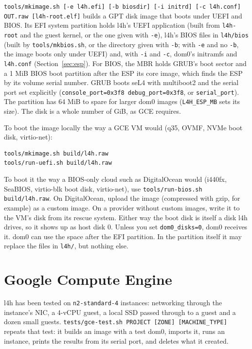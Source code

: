 \documentclass[11pt,a4paper]{report}
\newcommand{\cmd}[1]{\texttt{#1}}
\newcommand{\file}[1]{\texttt{#1}}
\begin{document}
\cmd{tools/mkimage.sh [-e l4h.efi] [-b biosdir] [-i initrd] [-c l4h.conf] OUT.raw
[l4h-root.elf]} builds a GPT disk image that boots under UEFI and BIOS.
Its EFI system partition holds
l4h's UEFI application (built from \texttt{l4h-root} and the guest kernel,
or the one given with \texttt{-e}), l4h's BIOS files in \file{l4h/bios}
(built by \cmd{tools/mkbios.sh}, or the directory given with
\texttt{-b}; with \texttt{-e} and no \texttt{-b}, the image boots only
under UEFI) and, with \texttt{-i} and \texttt{-c},
dom0's initramfs and \file{l4h.conf} (Section~\ref{sec:esp}). For BIOS,
the MBR holds GRUB's boot sector and a 1 MiB BIOS boot partition after
the ESP its core image, which finds the ESP by its volume serial number. GRUB boots seL4 with
multiboot2 and the serial port set explicitly
(\texttt{console\_port=0x3f8 debug\_port=0x3f8}, or \texttt{serial\_port}).
The partition has 64 MiB to spare for larger dom0 images
(\texttt{L4H\_ESP\_MB} sets its size). The disk is a whole number of GiB,
as GCE requires.

To boot the image locally the way a GCE VM would (q35, OVMF, NVMe boot disk,
virtio-net):
\begin{lstlisting}[language=bash]
tools/mkimage.sh build/l4h.raw
tools/run-uefi.sh build/l4h.raw
\end{lstlisting}
To boot it the way a BIOS-only cloud such as DigitalOcean would (i440fx,
SeaBIOS, virtio-blk boot disk, virtio-net), use
\cmd{tools/run-bios.sh build/l4h.raw}. On DigitalOcean, upload the image
(compressed with gzip, for example) as a custom image. On a provider
without custom images, write it to the VM's disk from its rescue system.
Either way the boot disk is itself a disk l4h drives, so it shows up as host disk 0. Unless
you set \texttt{dom0\_disks=0}, dom0 receives it. dom0 can use the space
after the EFI partition. In the partition itself it may replace the files
in \file{l4h/}, but nothing else.

\section{Google Compute Engine}

l4h has been tested on \texttt{n2-standard-4} instances: networking through
the instance's NIC, a 4-vCPU guest, a local SSD passed through to a guest and
a dozen small guests. \cmd{tests/gce-test.sh PROJECT [ZONE] [MACHINE\_TYPE]}
repeats that test: it builds an image with a test dom0, imports it, runs an
instance, prints the results from its serial port, and deletes what it
created.
\end{document}
